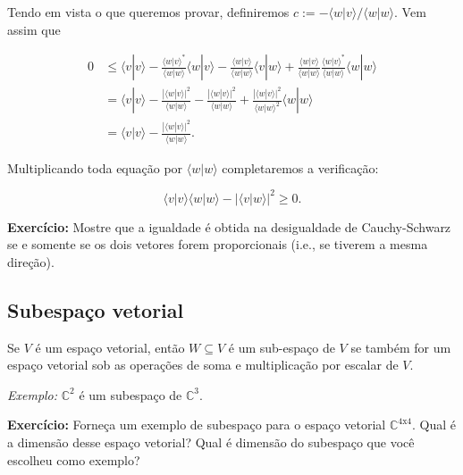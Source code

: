 \documentclass[11pt]{article}
\begin{document}
Tendo em vista o que queremos provar, definiremos
\(c:=-\langle w|v\rangle/\langle w|w\rangle\). Vem assim que

\begin{align}
0 & \le \langle v|v\rangle - \frac{\langle w|v\rangle^{*}}{\langle w|w\rangle}\langle w|v\rangle - \frac{\langle w|v\rangle}{\langle w|w\rangle}\langle v|w\rangle + \frac{\langle w|v\rangle}{\langle w|w\rangle}\frac{\langle w|v\rangle^{*}}{\langle w|w\rangle}\langle w|w\rangle \\
& = \langle v|v\rangle - \frac{|\langle w|v\rangle|^{2}}{\langle w|w\rangle} - \frac{|\langle w|v\rangle|^{2}}{\langle w|w\rangle} + \frac{|\langle w|v\rangle|^{2}}{\langle w|w\rangle^{2}}\langle w|w\rangle \\
& = \langle v|v\rangle - \frac{|\langle w|v\rangle|^{2}}{\langle w|w\rangle}.
\end{align}

Multiplicando toda equação por \(\langle w|w\rangle\) completaremos a
verificação:

\begin{equation}
\langle v|v\rangle\langle w|w\rangle - |\langle v|w\rangle|^{2} \ge 0.
\end{equation}

\textbf{Exercício:} Mostre que a igualdade é obtida na desigualdade de
Cauchy-Schwarz se e somente se os dois vetores forem proporcionais
(i.e., se tiverem a mesma direção).

    \subsection{Subespaço vetorial}\label{subespauxe7o-vetorial}

Se \(V\) é um espaço vetorial, então \(W\subseteq V\) é um sub-espaço de
\(V\) se também for um espaço vetorial sob as operações de soma e
multiplicação por escalar de \(V\).

\emph{Exemplo:} \(\mathbb{C}^{2}\) é um subespaço de \(\mathbb{C}^{3}\).

\textbf{Exercício:} Forneça um exemplo de subespaço para o espaço
vetorial \(\mathbb{C}^{4\text{x}4}\). Qual é a dimensão desse espaço
vetorial? Qual é dimensão do subespaço que você escolheu como exemplo?


    
    
    
    
\end{document}
